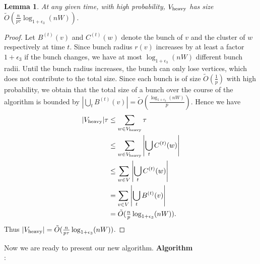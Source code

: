 \documentclass[11pt]{article}
\newtheorem{lemma}[theorem]{Lemma}
\theoremstyle{definition}
\theoremstyle{remark}
\begin{document}
\begin{lemma}\label{lm:size_heavy_moved}
 At any given time, with high probability, $ V_{\rm{heavy}} $ has size $\tilde O (\tfrac{n }{p\tau}\log_{1+\epsilon_3}(nW)) $.\label{lm:size_H}
\end{lemma}
\begin{proof}
    Let $B^{(t)}(v)$ and $C^{(t)}(w)$ denote the bunch of $v$  and the cluster of $w$ respectively at time $t$. Since bunch radius $r(v)$ increases by at least a factor $1+\epsilon_3$ if the bunch changes, we have at most $\log_{1+\epsilon_3}(nW)$ different bunch radii. Until the bunch radius increases, the bunch can only lose vertices, which does not contribute to the total size. Since each bunch is of size $\tilde{O}(\tfrac{1}{p})$ with high probability, we obtain that the total size of a bunch over the course of the algorithm is bounded by $\left|\bigcup_{t} B^{(t)}(v)\right|=\tilde{O}\left(\tfrac{\log_{1+\epsilon_3}(nW)}{p}\right)$. Hence we have 
    \begin{align*}
        |V_{\rm{heavy}}|\tau &\leq \sum_{w\in V_{\rm{heavy}}} \tau \\
        &\leq \sum_{w\in V_{\rm{heavy}}} \left| \bigcup_t C^{(t)}(w) \right| \\
        &\leq \sum_{w\in V} \left| \bigcup_t C^{(t)}(w) \right| \\
        &= \sum_{v\in V} \left| \bigcup_t B^{(t)}(v) \right| \\
        &= \tilde O ( \tfrac{n}{p}\log_{1+\epsilon_3}(nW)).
    \end{align*}
    Thus $|V_{\rm{heavy}}| = \tilde O (\tfrac{n }{p\tau}\log_{1+\epsilon_3}(nW))$.\qedhere
\end{proof}

Now we are ready to present our new algorithm. 
\textbf{Algorithm} \\
\Initialization{}:
\end{document}
